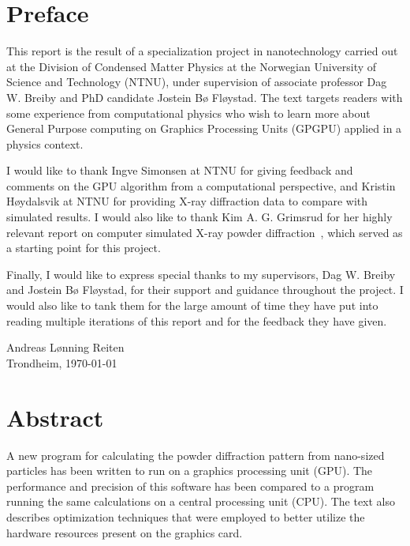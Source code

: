 \documentclass[11pt,twoside]{report}
\begin{document}

\chapter*{Preface}
This report is the result of a specialization project in nanotechnology carried out at the Division of Condensed Matter Physics at the Norwegian University of Science and Technology (NTNU), under supervision of associate professor Dag W. Breiby and PhD candidate Jostein Bø Fløystad. The text targets readers with some experience from computational physics who wish to learn more about General Purpose computing on Graphics Processing Units (GPGPU) applied in a physics context.

\indent I would like to thank Ingve Simonsen at NTNU for giving feedback and comments on the GPU algorithm from a computational perspective, and Kristin Høydalsvik at NTNU for providing X-ray diffraction data to compare with simulated results. I would also like to thank Kim A. G. Grimsrud for her highly relevant report on computer simulated X-ray powder diffraction~\cite{grimsrud}, which served as a starting point for this project. 

 
\indent Finally, I would like to express special thanks to my supervisors, Dag W. Breiby and Jostein Bø Fløystad, for their support and guidance throughout the project. I would also like to tank them for the large amount of time they have put into reading multiple iterations of this report and for the feedback they have given.

\vspace{3cm}
\noindent Andreas Lønning Reiten\\
Trondheim, \today



\chapter*{Abstract}
A new program for calculating the powder diffraction pattern from nano-sized particles has been written to run on a graphics processing unit (GPU).  
The performance and precision of this software has been compared to a program running the same calculations on a central processing unit (CPU).  The text also describes optimization techniques that were employed to better utilize the hardware resources present on the graphics card. 
\end{document}
